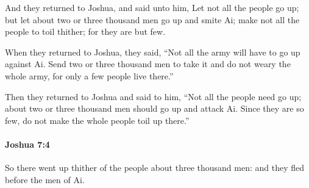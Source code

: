 			\begin{versebox}
					\item[BHS] 
					\item[ASV] And they returned to Joshua, and said unto him, Let not all the people go up; but let about two or three thousand men go up and smite Ai; make not all the people to toil thither; for they are but few.
					\item[NIV] When they returned to Joshua, they said, “Not all the army will have to go up against Ai. Send two or three thousand men to take it and do not weary the whole army, for only a few people live there.”
					\item[NRSV] Then they returned to Joshua and said to him, “Not all the people need go up; about two or three thousand men should go up and attack Ai. Since they are so few, do not make the whole people toil up there.”
			\end{versebox}

		\paragraph{Joshua 7:4} %
			\label{JOSHUA-7-4}

			So there went up thither of the people about three thousand men: and they fled before the men of Ai.

